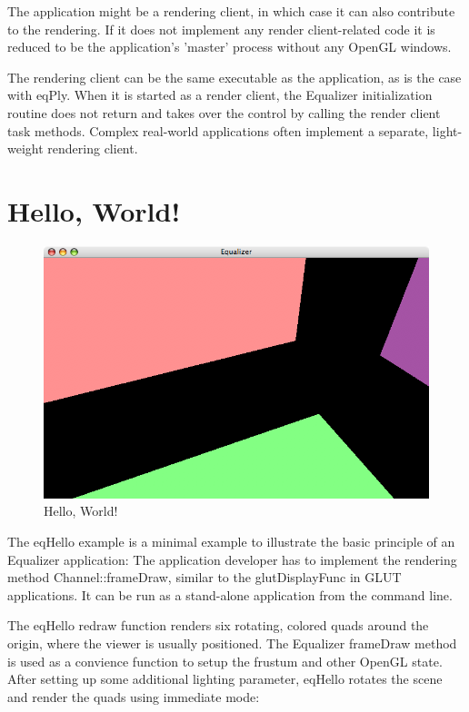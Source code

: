 \documentclass[10pt,a4]{scrartcl}
\begin{document}
The application might be a rendering client, in which case it can also
contribute to the rendering. If it does not implement any render
client-related code it is reduced to be the application's 'master'
process without any OpenGL windows.

The rendering client can be the same executable as the application, as
is the case with \textsf{eqPly}. When it is started as a render client,
the Equalizer initialization routine does not return and takes over the
control by calling the render client task methods. Complex real-world
applications often implement a separate, light-weight rendering client.



\section{Hello, World!}

\begin{figure}
  \includegraphics[width=.6\textwidth]{images/eqHello.png}
  {\caption{\small\label{fHello}Hello, World!}}
\end{figure}

The \textsf{eqHello} example is a minimal example to illustrate the
basic principle of an Equalizer application: The application developer
has to implement the rendering method \textsf{Channel::frameDraw},
similar to the \textsf{glutDisplayFunc} in GLUT applications. It can be
run as a stand-alone application from the command line.

The \textsf{eqHello} redraw function renders six rotating, colored quads
around the origin, where the viewer is usually positioned. The Equalizer
\textsf{frameDraw} meth\-od is used as a convience function to setup the
frustum and other OpenGL state. After setting up some additional
lighting parameter, \textsf{eqHello} rotates the scene and render the
quads using immediate mode:
\end{document}
